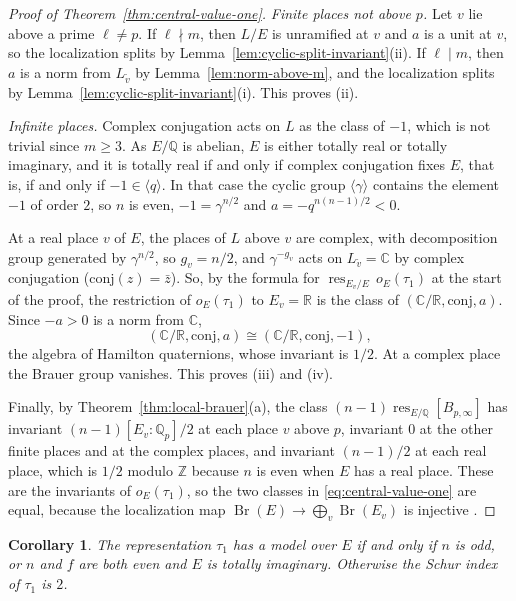 \documentclass[a4paper,11pt]{amsart}
\newtheorem{corollary}[theorem]{Corollary}
\theoremstyle{definition}
\theoremstyle{remark}
\numberwithin{equation}{section}
\newcommand{\Q}{\mathbb{Q}}
\newcommand{\Z}{\mathbb{Z}}
\DeclareMathOperator{\Br}{Br}
\DeclareMathOperator{\res}{res}
\newcommand{\R}{\mathbb{R}}
\newcommand{\C}{\mathbb{C}}
\begin{document}
\begin{proof}[Proof of Theorem~\ref{thm:central-value-one}]
\emph{Finite places not above $p$.} Let $v$ lie above a prime $\ell\neq p$. If $\ell\nmid m$, then $L/E$ is unramified at $v$ and $a$ is a unit at $v$, so the localization splits by Lemma~\ref{lem:cyclic-split-invariant}(ii). If $\ell\mid m$, then $a$ is a norm from $L_{\tilde v}$ by Lemma~\ref{lem:norm-above-m}, and the localization splits by Lemma~\ref{lem:cyclic-split-invariant}(i). This proves (ii).

\emph{Infinite places.} Complex conjugation acts on $L$ as the class of $-1$, which is not trivial since $m\geq3$. As $E/\Q$ is abelian, $E$ is either totally real or totally imaginary, and it is totally real if and only if complex conjugation fixes $E$, that is, if and only if $-1\in\langle q\rangle$. In that case the cyclic group $\langle\gamma\rangle$ contains the element $-1$ of order $2$, so $n$ is even, $-1=\gamma^{n/2}$ and $a=-q^{n(n-1)/2}<0$.

At a real place $v$ of $E$, the places of $L$ above $v$ are complex, with decomposition group generated by $\gamma^{n/2}$, so $g_v=n/2$, and $\gamma^{-g_v}$ acts on $L_{\tilde v}=\C$ by complex conjugation ($\mathrm{conj}(z)=\bar z$). So, by the formula for $\res_{E_v/E}\,o_E(\tau_1)$ at the start of the proof, the restriction of $o_E(\tau_1)$ to $E_v=\R$ is the class of $(\C/\R,\mathrm{conj},a)$. Since $-a>0$ is a norm from $\C$,
\[
 (\C/\R,\mathrm{conj},a)\cong(\C/\R,\mathrm{conj},-1),
\]
the algebra of Hamilton quaternions, whose invariant is $1/2$. At a complex place the Brauer group vanishes. This proves (iii) and (iv).

Finally, by Theorem~\ref{thm:local-brauer}(a), the class $(n-1)\res_{E/\Q}[B_{p,\infty}]$ has invariant $(n-1)[E_v:\Q_p]/2$ at each place $v$ above $p$, invariant $0$ at the other finite places and at the complex places, and invariant $(n-1)/2$ at each real place, which is $1/2$ modulo $\Z$ because $n$ is even when $E$ has a real place. These are the invariants of $o_E(\tau_1)$, so the two classes in \eqref{eq:central-value-one} are equal, because the localization map $\Br(E)\to\bigoplus_v\Br(E_v)$ is injective \cite[VII, Theorem~7.1, and IV, Theorem~3.14]{Mil20}.
\end{proof}

\begin{corollary}\label{cor:splitting}
The representation $\tau_1$ has a model over $E$ if and only if $n$ is odd, or $n$ and $f$ are both even and $E$ is totally imaginary. Otherwise the Schur index of $\tau_1$ is $2$.
\end{corollary}
\end{document}
